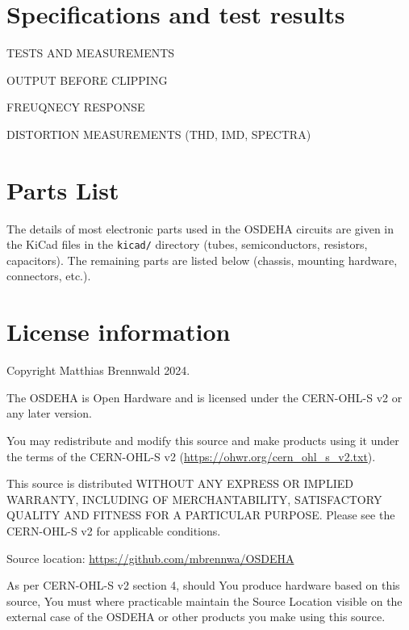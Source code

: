 \section{Specifications and test results}

TESTS AND MEASUREMENTS

OUTPUT BEFORE CLIPPING

FREUQNECY RESPONSE

DISTORTION MEASUREMENTS (THD, IMD, SPECTRA)


\section{Parts List}

The details of most electronic parts used in the OSDEHA circuits are given in the KiCad files in the {\tt kicad/} directory (tubes, semiconductors, resistors, capacitors). The remaining parts are listed below (chassis, mounting hardware, connectors, etc.).

{\footnotesize {}}

\clearpage
\section{License information} 
Copyright Matthias Brennwald 2024.                                                    

The OSDEHA is Open Hardware and is licensed under the CERN-OHL-S v2 or any later version.

You may redistribute and modify this source and make products using it under the terms of the CERN-OHL-S v2 (\url{https://ohwr.org/cern_ohl_s_v2.txt}).

This source is distributed WITHOUT ANY EXPRESS OR IMPLIED WARRANTY, INCLUDING OF MERCHANTABILITY, SATISFACTORY QUALITY AND FITNESS FOR A PARTICULAR PURPOSE. Please see the CERN-OHL-S v2 for applicable conditions.

Source location: \url{https://github.com/mbrennwa/OSDEHA}

As per CERN-OHL-S v2 section 4, should You produce hardware based on this source, You must where practicable maintain the Source Location visible on the external case of the OSDEHA or other products you make using this source.            


\clearpage





